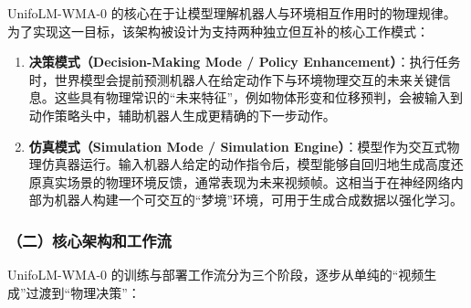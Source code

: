 UnifoLM-WMA-0 的核心在于让模型理解机器人与环境相互作用时的物理规律。为了实现这一目标，该架构被设计为支持两种独立但互补的核心工作模式：

\begin{enumerate}
\def\labelenumi{\arabic{enumi}.}
\tightlist
\item
  \textbf{决策模式（Decision-Making Mode / Policy Enhancement）}：执行任务时，世界模型会提前预测机器人在给定动作下与环境物理交互的未来关键信息。这些具有物理常识的``未来特征''，例如物体形变和位移预判，会被输入到动作策略头中，辅助机器人生成更精确的下一步动作。
\item
  \textbf{仿真模式（Simulation Mode / Simulation Engine）}：模型作为交互式物理仿真器运行。输入机器人给定的动作指令后，模型能够自回归地生成高度还原真实场景的物理环境反馈，通常表现为未来视频帧。这相当于在神经网络内部为机器人构建一个可交互的``梦境''环境，可用于生成合成数据以强化学习。
\end{enumerate}

\hypertarget{ux4e8cux6838ux5fc3ux67b6ux6784ux548cux5de5ux4f5cux6d41}{%
\subsubsection{（二）核心架构和工作流}\label{ux4e8cux6838ux5fc3ux67b6ux6784ux548cux5de5ux4f5cux6d41}}

UnifoLM-WMA-0 的训练与部署工作流分为三个阶段，逐步从单纯的``视频生成''过渡到``物理决策''：

